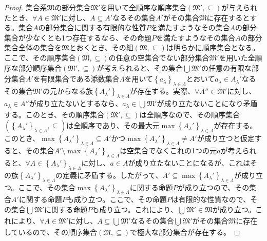 \documentclass[dvipdfmx]{jsarticle}
\begin{document}
\begin{proof}
集合系$\mathfrak{M}$の部分集合$\mathfrak{M}'$を用いて全順序な順序集合$\left( \mathfrak{M}', \subseteq \right)$が与えられたとき、$\forall A \in \mathfrak{M}'$に対し、$A \subseteq A'$なるその集合$A'$がその集合$\mathfrak{M}$に存在するとする。集合$A$の部分集合に関する有限的な性質$P$を満たすようなその集合$A$の部分集合が少なくとも1つ存在するなら、その命題$P$を満たすようなその集合$A$の部分集合全体の集合を$\mathfrak{M}$とおくとき、その組$\left( \mathfrak{M, \subseteq} \right)$は明らかに順序集合となる。ここで、その順序集合$\left( \mathfrak{M, \subseteq} \right)$の任意の空集合でない部分集合$\mathfrak{M}'$を用いた全順序な部分順序集合$\left( \mathfrak{M}', \subseteq \right)$が考えられると、その集合$\bigcup_{} \mathfrak{M}'$の任意の有限な部分集合$A'$を有限集合である添数集合$\varLambda $を用いて$\left\{ a_{\lambda} \right\}_{\lambda \in \varLambda }$とおいて$a_{\lambda} \in A_{\lambda}'$なるその集合$\mathfrak{M}'$の元からなる族$\left\{ A_{\lambda}' \right\}_{\lambda \in \varLambda }$が存在する。実際、$\forall A'' \in \mathfrak{M}'$に対し、$a_{\lambda} \in A''$が成り立たないとするなら、$a_{\lambda} \in \bigcup_{} \mathfrak{M}'$が成り立たないことになり矛盾する。このとき、その順序集合$\left( \mathfrak{M}', \subseteq \right)$は全順序なので、その順序集合$\left( \left\{ A_{\lambda}' \right\}_{\lambda \in \varLambda }, \subseteq \right)$は全順序であり、その最大元$\max\left\{ A_{\lambda}' \right\}_{\lambda \in \varLambda }$が存在する。このとき、$\max\left\{ A_{\lambda}' \right\}_{\lambda \in \varLambda } \subseteq A'$かつ$\max\left\{ A_{\lambda}' \right\}_{\lambda \in \varLambda } \neq A'$が成り立つと仮定すると、その集合$A' \setminus \max\left\{ A_{\lambda}' \right\}_{\lambda \in \varLambda }$は空集合でなくこれの1つの元$a$が考えられると、$\forall A \in \left\{ A_{\lambda}' \right\}_{\lambda \in \varLambda }$に対し、$a \in A$が成り立たないことになるが、これはその族$\left\{ A_{\lambda}' \right\}_{\lambda \in \varLambda }$の定義に矛盾する。したがって、$A' \subseteq \max\left\{ A_{\lambda}' \right\}_{\lambda \in \varLambda }$が成り立つ。ここで、その集合$\max\left\{ A_{\lambda}' \right\}_{\lambda \in \varLambda }$に関する命題$P$が成り立つので、その集合$A'$に関する命題$P$も成り立つ。ここで、その命題$P$は有限的な性質なので、その集合$\bigcup_{} \mathfrak{M}'$に関する命題$P$も成り立つ。これにより、$\bigcup_{} \mathfrak{M}'\in \mathfrak{M}$が成り立つ。これにより、$\forall A \in \mathfrak{M}'$に対し、$A \subseteq \bigcup_{} \mathfrak{M}'$なるその集合$\bigcup_{} \mathfrak{M}'$がその集合$\mathfrak{M}$に存在しているので、その順序集合$\left( \mathfrak{M, \subseteq} \right)$で極大な部分集合が存在する。
\end{proof}
\end{document}

